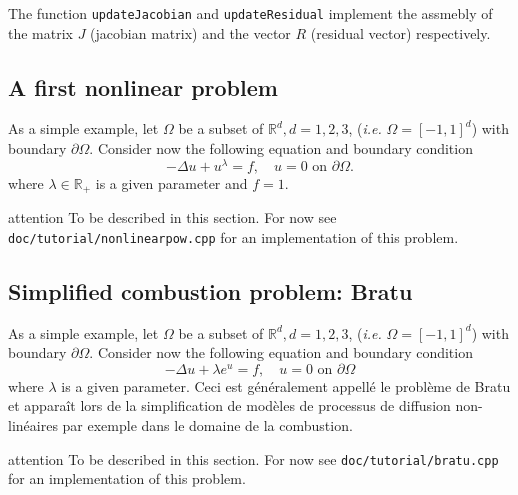 \documentclass[a4paper]{book}
\newcommand{\ficnota}{attention}
\newenvironment{nota}{%
  \begin{pictonote}{\ficnota}}{\end{pictonote}}
\begin{document}
The function \lstinline!updateJacobian! and \lstinline!updateResidual!
implement the assmebly of the matrix $J$ (jacobian matrix) and the
vector $R$ (residual vector) respectively.

\subsection{A first nonlinear problem}
\label{sec:bratu}

As a simple example, let $\Omega$ be a subset of $\mathbb{R}^d, d=1,2,3$,
(\emph{i.e.} $\Omega=[-1,1]^d$) with boundary $\partial
\Omega$. Consider now the following equation and boundary condition
\begin{equation}
  \label{eq:29}
  -\Delta u + u^\lambda = f,\quad u = 0 \text{ on } \partial \Omega.
\end{equation}
where $\lambda \in \mathbb{R_+}$ is a given parameter and $f=1$.


\begin{nota}
  To be described in this section. For now see
  \texttt{doc/tutorial/nonlinearpow.cpp} for an implementation of this
  problem.
\end{nota}

\subsection{Simplified combustion problem: Bratu}
\label{sec:bratu}

As a simple example, let $\Omega$ be a subset of $\mathbb{R}^d, d=1,2,3$,
(\emph{i.e.} $\Omega=[-1,1]^d$) with boundary $\partial
\Omega$. Consider now the following equation and boundary condition
\begin{equation}
  \label{eq:29}
  -\Delta u + \lambda e^u = f,\quad u = 0 \text{ on } \partial \Omega
\end{equation}
where $\lambda$ is a given parameter. Ceci est généralement appellé le
problème de Bratu et apparaît lors de la simplification de modèles de
processus de diffusion non-linéaires par exemple dans le domaine de la
combustion.

\begin{nota}
  To be described in this section. For now see
  \texttt{doc/tutorial/bratu.cpp} for an implementation of this
  problem.
\end{nota}


\end{document}
